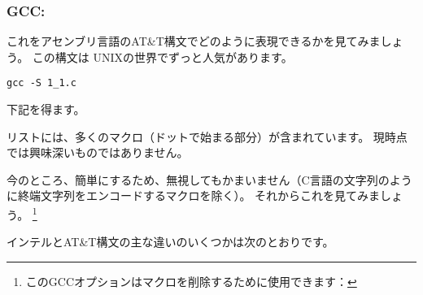 \subsubsection{GCC: \ATTSyntax}
\label{ATT_syntax}

これをアセンブリ言語のAT\&T構文でどのように表現できるかを見てみましょう。 この構文は
UNIXの世界でずっと人気があります。

\begin{lstlisting}[caption=let's compile in GCC 4.7.3]
gcc -S 1_1.c
\end{lstlisting}

下記を得ます。



リストには、多くのマクロ（ドットで始まる部分）が含まれています。 現時点では興味深いものではありません。

今のところ、簡単にするため、無視してもかまいません（C言語の文字列のように終端文字列をエンコードするマクロを除く）。 
それからこれを見てみましょう。
\footnote{このGCCオプションはマクロを削除するために使用できます：}



\myindex{\ATTSyntax}
\myindex{\IntelSyntax}
インテルとAT\&T構文の主な違いのいくつかは次のとおりです。

